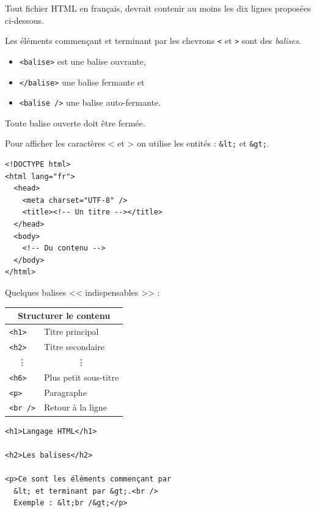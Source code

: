 
Tout fichier HTML en français, devrait contenir au moins les dix lignes proposées ci-dessous.

\begin{multicols}{2}
Les éléments commençant et terminant par les chevrons \texttt{<} et \texttt{>} sont des \emph{balises}.

\begin{itemize}
	\item \texttt{<balise>} est une balise ouvrante,
	\item \texttt{</balise>} une balise fermante et
	\item \texttt{<balise />} une balise auto-fermante.
\end{itemize}

Toute balise ouverte doit être fermée.

Pour afficher les caractères < et > on utilise les entités : \texttt{&lt;} et \texttt{&gt;}.

\begin{verbatim}
<!DOCTYPE html>
<html lang="fr">
  <head>
    <meta charset="UTF-8" />
    <title><!-- Un titre --></title>
  </head>
  <body>
    <!-- Du contenu -->
  </body>
</html>
\end{verbatim}
\end{multicols}

Quelques balises << indispensables >> :

\begin{multicols}{2}
\begin{tabular}{|ll|}
\hline
\multicolumn{2}{|c|}{Structurer le contenu}\\
\hline
\texttt{<h1>} & Titre principal \\
\texttt{<h2>} & Titre secondaire \\
\multicolumn{1}{|c}{\vdots} & \multicolumn{1}{c|}{\vdots} \\
\texttt{<h6>} & Plus petit sous-titre\\
\texttt{<p>}  & Paragraphe\\
\texttt{<br />} & Retour à la ligne\\
\hline
\end{tabular}


\begin{verbatim}
<h1>Langage HTML</h1>

<h2>Les balises</h2>

<p>Ce sont les éléments commençant par
  &lt; et terminant par &gt;.<br />
  Exemple : &lt;br /&gt;</p>
\end{verbatim}
\end{multicols}

